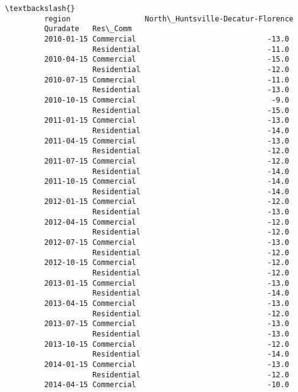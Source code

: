 \documentclass[11pt]{article}
\begin{document}
\begin{Verbatim}[commandchars=\\\{\}]
                                                                   \textbackslash{}
         region                 North\_Huntsville-Decatur-Florence   
         Quradate   Res\_Comm                                        
         2010-01-15 Commercial                              -13.0   
                    Residential                             -11.0   
         2010-04-15 Commercial                              -15.0   
                    Residential                             -12.0   
         2010-07-15 Commercial                              -11.0   
                    Residential                             -13.0   
         2010-10-15 Commercial                               -9.0   
                    Residential                             -15.0   
         2011-01-15 Commercial                              -13.0   
                    Residential                             -14.0   
         2011-04-15 Commercial                              -13.0   
                    Residential                             -12.0   
         2011-07-15 Commercial                              -12.0   
                    Residential                             -14.0   
         2011-10-15 Commercial                              -14.0   
                    Residential                             -14.0   
         2012-01-15 Commercial                              -12.0   
                    Residential                             -13.0   
         2012-04-15 Commercial                              -12.0   
                    Residential                             -12.0   
         2012-07-15 Commercial                              -13.0   
                    Residential                             -12.0   
         2012-10-15 Commercial                              -12.0   
                    Residential                             -12.0   
         2013-01-15 Commercial                              -13.0   
                    Residential                             -14.0   
         2013-04-15 Commercial                              -13.0   
                    Residential                             -12.0   
         2013-07-15 Commercial                              -13.0   
                    Residential                             -13.0   
         2013-10-15 Commercial                              -12.0   
                    Residential                             -14.0   
         2014-01-15 Commercial                              -13.0   
                    Residential                             -12.0   
         2014-04-15 Commercial                              -10.0   

\end{Verbatim}
\end{document}
